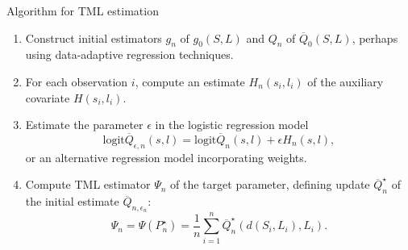 \documentclass{beamer}
\begin{document}
\begin{frame}[c]{Algorithm for TML estimation}

\begin{center}
\begin{enumerate}\label{tmle_algo}
  \itemsep6pt
  \item Construct initial estimators $g_n$ of $g_0(S, L)$ and $Q_n$ of
    $\overline{Q}_0(S, L)$, perhaps using data-adaptive regression techniques.
  \item For each observation $i$, compute an estimate $H_n(s_i, l_i)$ of the
    auxiliary covariate $H(s_i, l_i)$.
  \item Estimate the parameter $\epsilon$ in the logistic regression model
    $$\text{logit}\overline{Q}_{\epsilon, n}(s, l) =
    \text{logit}\overline{Q}_n(s, l) + \epsilon H_n(s, l),$$
    or an alternative regression model incorporating weights.
  \item Compute TML estimator $\Psi_n$ of the target parameter, defining update
    $\overline{Q}_n^{\star}$ of the initial estimate
    $\overline{Q}_{n, \epsilon_n}$:
    \begin{equation*}\label{tmle}
      \Psi_n = \Psi(P_n^{\star}) = \frac{1}{n} \sum_{i = 1}^n
        \overline{Q}_n^{\star}(d(S_i, L_i), L_i).
      \end{equation*}
\end{enumerate}
\end{center}


\end{frame}

\end{document}
